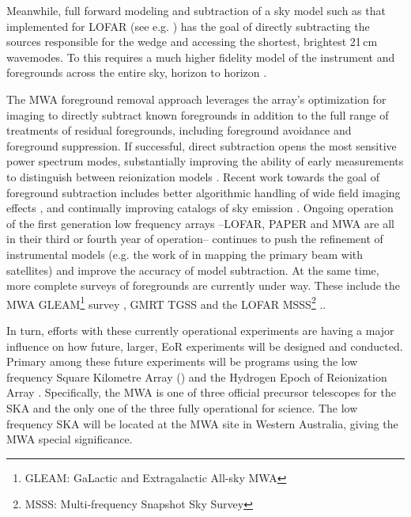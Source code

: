 \documentclass[twolcolumn,iop]{emulateapj}
\begin{document}
 Meanwhile, full forward modeling and subtraction of a sky model such as that implemented for LOFAR (see e.g. \cite{Jelic:2008p2130,Yatawatta:2013p9699}) has the goal of directly subtracting the sources responsible for the wedge and accessing the shortest, brightest 21\,cm wavemodes. To this requires a much higher fidelity model of the instrument and foregrounds across the entire sky, horizon to horizon \cite{2015ApJ...804...14T}.


The MWA foreground removal approach leverages the array's optimization for imaging to directly subtract known foregrounds in addition to the full range of treatments of residual foregrounds, including foreground avoidance and foreground suppression.  If successful, direct subtraction opens the most sensitive power spectrum modes, substantially improving the ability of early measurements to distinguish between reionization models \citep{Beardsley:2013p9952,Pober:2014p10390}. Recent work towards the goal of foreground subtraction includes better algorithmic handling of wide field imaging effects \citep{Tasse:2012p9459,Bhatnagar..2013ApJ,Sullivan:2012p9457,Ord:2010p8442,2014MNRAS.444..606O}, and continually improving catalogs of sky emission \citep{deOliveiraCosta:2008p2242,Jacobs:2011p8438,2013ApJ...776..108J,Hurley-walker:2014p45}. Ongoing operation of the first generation low frequency arrays --LOFAR, PAPER and MWA are all in their  third or fourth year of operation-- continues to push the refinement of instrumental models (e.g. the work of \cite{2015RaSc...50..614N} in mapping the primary beam with satellites) and improve the accuracy of model subtraction.  At the same time, more complete surveys of foregrounds are currently under way. These include the MWA GLEAM\footnote{GLEAM: GaLactic and Extragalactic All-sky MWA} survey \citep{2015PASA...32...25W}, GMRT TGSS\citep{Intema:2016arXiv160304368I}  and the LOFAR MSSS\footnote{MSSS: Multi-frequency Snapshot Sky Survey} \citep{2015A&A...582A.123H}..   

In turn, efforts with these currently operational experiments are having a major influence on how future, larger, EoR experiments will be designed and conducted.  Primary among these future experiments will be programs using the low frequency Square Kilometre Array (\cite{2014aska.confE...1K}) and the Hydrogen Epoch of Reionization Array \citep[HERA][]{Pober:2014p10390}.  Specifically, the MWA is one of three official precursor telescopes for the SKA and the only one of the three fully operational for science.  The low frequency SKA will be located at the MWA site in Western Australia, giving the MWA special significance.
\end{document}
